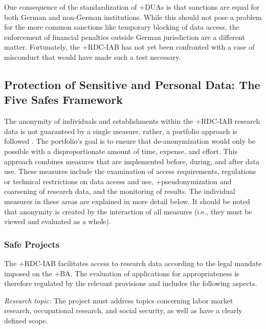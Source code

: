 \documentclass[
]{WileySix}
\begin{document}
One consequence of the standardization of +DUA\textbar s is that sanctions are equal for both German and non-German institutions. While this should not pose a problem for the more common sanctions like temporary blocking of data access, the enforcement of financial penalties outside German jurisdiction are a different matter. Fortunately, the +RDC-IAB\textbar{} has not yet been confronted with a case of misconduct that would have made such a test necessary.

\hypertarget{protection-of-sensitive-and-personal-data-the-five-safes-framework}{%
\subsection{Protection of Sensitive and Personal Data: The Five Safes Framework}\label{protection-of-sensitive-and-personal-data-the-five-safes-framework}}

The anonymity of individuals and establishments within the +RDC-IAB\textbar{} research data is not guaranteed by a single measure, rather, a portfolio approach is followed \citep{hochfellner2014}. The portfolio's goal is to ensure that de-anonymization would only be possible with a disproportionate amount of time, expense, and effort. This approach combines measures that are implemented before, during, and after data use. These measures include the examination of access requirements, regulations or technical restrictions on data access and use, +pseudonymization\textbar{} and coarsening of research data, and the monitoring of results. The individual measures in these areas are explained in more detail below. It should be noted that anonymity is created by the interaction of all measures (i.e., they must be viewed and evaluated as a whole).

\hypertarget{safe-projects}{%
\subsubsection{Safe Projects}\label{safe-projects}}

The +RDC-IAB\textbar{} facilitates access to research data according to the legal mandate imposed on the +BA\textbar. The evaluation of applications for appropriateness is therefore regulated by the relevant provisions and includes the following aspects.

\emph{Research topic:} The project must address topics concerning labor market research, occupational research, and social security, as well as have a clearly defined scope.
\end{document}
